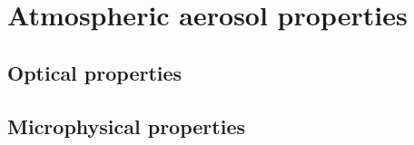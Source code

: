 \chapter{Atmospheric aerosol properties}
\label{sect:sota_chapter5}

\section{Optical properties}

\section{Microphysical properties}
